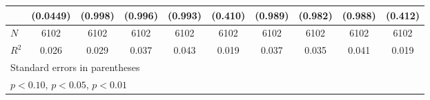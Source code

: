 \begin{table}[htbp]
\begin{tabular}{l*{9}{c}}
            &    (0.0449)         &     (0.998)         &     (0.996)         &     (0.993)         &     (0.410)         &     (0.989)         &     (0.982)         &     (0.988)         &     (0.412)         \\
\hline
\(N\)       &        6102         &        6102         &        6102         &        6102         &        6102         &        6102         &        6102         &        6102         &        6102         \\
\(R^{2}\)   &       0.026         &       0.029         &       0.037         &       0.043         &       0.019         &       0.037         &       0.035         &       0.041         &       0.019         \\
\hline\hline
\multicolumn{10}{l}{\footnotesize Standard errors in parentheses}\\
\multicolumn{10}{l}{\footnotesize \sym{*} \(p<0.10\), \sym{**} \(p<0.05\), \sym{***} \(p<0.01\)}\\
\end{tabular}
\end{table}
